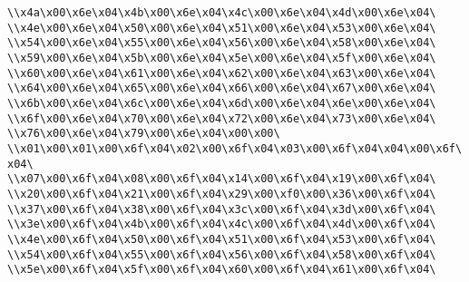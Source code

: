 \verb|\\x4a\x00\x6e\x04\x4b\x00\x6e\x04\x4c\x00\x6e\x04\x4d\x00\x6e\x04\|\newline
\verb|\\x4e\x00\x6e\x04\x50\x00\x6e\x04\x51\x00\x6e\x04\x53\x00\x6e\x04\|\newline
\verb|\\x54\x00\x6e\x04\x55\x00\x6e\x04\x56\x00\x6e\x04\x58\x00\x6e\x04\|\newline
\verb|\\x59\x00\x6e\x04\x5b\x00\x6e\x04\x5e\x00\x6e\x04\x5f\x00\x6e\x04\|\newline
\verb|\\x60\x00\x6e\x04\x61\x00\x6e\x04\x62\x00\x6e\x04\x63\x00\x6e\x04\|\newline
\verb|\\x64\x00\x6e\x04\x65\x00\x6e\x04\x66\x00\x6e\x04\x67\x00\x6e\x04\|\newline
\verb|\\x6b\x00\x6e\x04\x6c\x00\x6e\x04\x6d\x00\x6e\x04\x6e\x00\x6e\x04\|\newline
\verb|\\x6f\x00\x6e\x04\x70\x00\x6e\x04\x72\x00\x6e\x04\x73\x00\x6e\x04\|\newline
\verb|\\x76\x00\x6e\x04\x79\x00\x6e\x04\x00\x00\|\newline
\verb|\\x01\x00\x01\x00\x6f\x04\x02\x00\x6f\x04\x03\x00\x6f\x04\x04\x00\x6f\x04\|\newline
\verb|\\x07\x00\x6f\x04\x08\x00\x6f\x04\x14\x00\x6f\x04\x19\x00\x6f\x04\|\newline
\verb|\\x20\x00\x6f\x04\x21\x00\x6f\x04\x29\x00\xf0\x00\x36\x00\x6f\x04\|\newline
\verb|\\x37\x00\x6f\x04\x38\x00\x6f\x04\x3c\x00\x6f\x04\x3d\x00\x6f\x04\|\newline
\verb|\\x3e\x00\x6f\x04\x4b\x00\x6f\x04\x4c\x00\x6f\x04\x4d\x00\x6f\x04\|\newline
\verb|\\x4e\x00\x6f\x04\x50\x00\x6f\x04\x51\x00\x6f\x04\x53\x00\x6f\x04\|\newline
\verb|\\x54\x00\x6f\x04\x55\x00\x6f\x04\x56\x00\x6f\x04\x58\x00\x6f\x04\|\newline
\verb|\\x5e\x00\x6f\x04\x5f\x00\x6f\x04\x60\x00\x6f\x04\x61\x00\x6f\x04\|\newline
